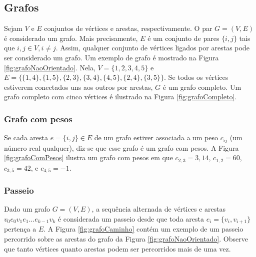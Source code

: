 \subsection{Grafos}
Sejam $V$ e $E$ conjuntos de vértices e arestas, respectivamente. O par \(G = (V, E)\) é considerado um grafo. Mais precisamente, \(E\) é um conjunto de pares \(\{i, j\}\) tais que \(i, j \in V, i \neq j\). Assim, qualquer conjunto de vértices ligados por arestas pode ser considerado um grafo. Um exemplo de grafo é mostrado na Figura \ref{fig:grafoNaoOrientado}. Nela, \(V = \{1,2,3,4,5\}\) e \(E = \{\{1,4\}, \{1,5\}, \{2,3\}, \{3,4\}, \{4,5\}, \{2,4\}, \{3,5\}\}\). Se todos os vértices estiverem conectados uns aos outros por arestas, \(G\) é um grafo completo. Um grafo completo com cinco vértices é ilustrado na Figura \ref{fig:grafoCompleto}.

\subsubsection{Grafo com pesos}
Se cada aresta $e = \{i,j\} \in E$ de um grafo estiver associada a um peso $c_{ij}$ (um número real qualquer), diz-se que esse grafo é um grafo com pesos. A Figura \ref{fig:grafoComPesos} ilustra um grafo com pesos em que $c_{2,3} = 3{,}14$, $c_{1,2} = 60$, $c_{3,5} = 42$, e $c_{4,5} = -1$.

\iffalse

\subsubsection{Grafo orientado}
Sejam \(V\) um conjunto de vértices e \(A\) um conjunto de arcos. \(G = (V,A)\) é um grafo orientado. Neste caso, \(A\) é um conjunto de pares ordenados (i.e., \((i,j) \neq (j,i)\)). Um exemplo de grafo orientado é mostrado na Figura \ref{fig:exemploGrafoOrientado}. 

\fi

\subsubsection{Passeio}
Dado um grafo $G = (V,E)$, a sequência alternada de vértices e arestas $v_0 e_0 v_1 e_1 \dots e_{k-1} v_k$ é considerada um passeio desde que toda aresta $e_i = \{v_i, v_{i+1}\}$ pertença a $E$. A Figura \ref{fig:grafoCaminho} contém um exemplo de um passeio percorrido sobre as arestas do grafo da Figura \ref{fig:grafoNaoOrientado}. Observe que tanto vértices quanto arestas podem ser percorridos mais de uma vez.

